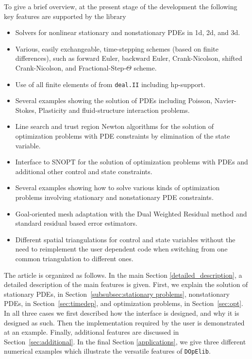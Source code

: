 \documentclass[smallextended]{svjour3}       %
\numberwithin{equation}{section}
\newcommand{\deal}{\texttt{deal.II}}
\newcommand{\dope}{\texttt{DOpElib}}
\begin{document}
To give a brief overview, at the present stage of the development 
the following key features are supported by the library
\begin{itemize}
\item Solvers for nonlinear stationary and nonstationary PDEs in 1d, 2d, and 3d.
\item Various, easily exchangeable, 
  time-stepping schemes (based on finite differences), 
  such as forward Euler, backward Euler,
  Crank-Nicolson, shifted Crank-Nicolson, and Fractional-Step-$\Theta$ scheme.
\item Use of all finite elements of from \deal{} including hp-support.
\item Several examples showing the solution of PDEs including
   Poisson, Navier-Stokes, Plasticity and fluid-structure interaction problems. 
\item Line search and trust region Newton algorithms for the 
   solution of optimization problems with PDE constraints by elimination of 
   the state variable.
\item Interface to SNOPT for the solution of optimization problems with PDEs and
  additional other control and state constraints.
\item Several examples showing how to solve various kinds of optimization 
  problems involving stationary and nonstationary PDE constraints.
\item Goal-oriented mesh adaptation with the Dual Weighted Residual method and
  standard residual based error estimators.
\item Different spatial triangulations for control and state variables without
  the need to reimplement the user dependent code when switching from one common 
  triangulation to different ones.
\end{itemize}

The article is organized as follows. In the main Section
\ref{detailed_description}, a detailed description of 
the main features is given. First, we explain the solution 
of stationary PDEs, in Section~\ref{subsubsec:stationary problems}, nonstationary PDEs, in Section~\ref{sec:timedep}, and optimization problems, in 
Section~\ref{sec:opt}. 
In all three cases we first described how the interface is designed, and why 
it is designed as such. Then the implementation required by the user is 
demonstrated at an example.
Finally, additional features are discussed in Section~\ref{sec:additional}. 
In the final Section
\ref{applications}, we give three different numerical 
examples which illustrate the versatile features of \dope{}. 
\end{document}

